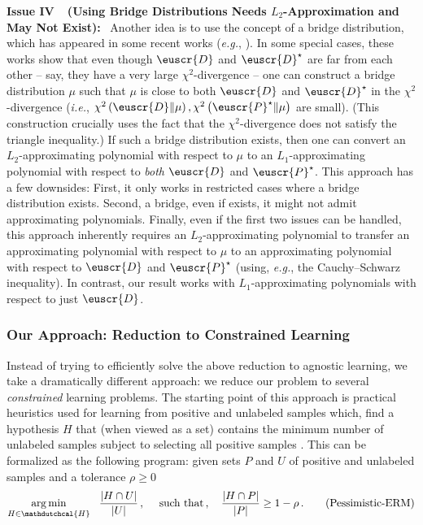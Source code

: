 \documentclass[11pt]{article}
\theoremstyle{plain}
\theoremstyle{definition}
\theoremstyle{remark}
\def\abs#1{\left| #1 \right|}
\newcommand{\inparen}[1]{\left(#1\right)}
\newcommand{\argmin}{\operatornamewithlimits{arg\,min}}
\newcommand{\chidiv}[2]{\chi^2\inparen{#1\|#2}}
\newcommand{\customcal}[1]{\euscr{#1}}
\newcommand{\cD}{\customcal{D}}
\newcommand{\cP}{\customcal{P}}
\renewcommand{\paragraph}[1]{\medskip \noindent\textbf{#1}~}
\newcommand{\ie}{\textit{i.e.}}
\newcommand{\eg}{\textit{e.g.}}
\newcommand{\hypo}[1]{\mathdutchcal{#1}}
\newcommand{\hyH}{\hypo{H}}
\newcommand{\pERM}{Pessimistic-ERM}
\newcommand{\cDtrue}{\cD^\star}
\newcommand{\cPtrue}{\cP^\star}
\newcommand{\nL}{L}
\begin{document}
            \paragraph{Issue IV~~(Using Bridge Distributions Needs $\nL_2$-Approximation and May Not Exist):} 
                Another idea is to use the concept of a bridge distribution, which has appeared in some recent works (\eg{}, \cite{Kontonis2019EfficientTS,kalavasis2024transfer,lee2024unknown}).
                In some special cases, these works show that even though $\cD$ and $\cDtrue$ are far from each other -- say, they have a very large $\chi^2$-divergence -- one can construct a bridge distribution $\mu$ such that $\mu$ is close to both $\cD$ and $\cDtrue$ in the $\chi^2$-divergence (\ie{}, $\chidiv{\cD}{\mu},\chidiv{\cPtrue}{\mu}$ are small).
                (This construction crucially uses the fact that the $\chi^2$-divergence does not satisfy the triangle inequality.)
                If such a bridge distribution exists, then one can convert an $\nL_2$-approximating polynomial with respect to $\mu$  to an $\nL_1$-approximating polynomial with respect to \textit{both} $\cD$ and $\cPtrue$.
                This approach has a few downsides:
                First, it only works in restricted cases where a bridge distribution exists.
                Second, a bridge, even if exists, it might not admit approximating polynomials.
                Finally, even if the first two issues can be handled, this approach inherently require{s} an $\nL_2$-approximating polynomial to transfer an approximating polynomial with respect to $\mu$ to an approximating polynomial with respect to $\cD$ and $\cPtrue$ (using, \eg{}, the Cauchy--Schwarz inequality).
            In contrast, our result works with $\nL_1$-approximating polynomials with respect to just $\cD$.
                
            
                
        \subsubsection{Our Approach: Reduction to Constrained Learning} 
            Instead of trying to efficiently solve the above reduction to agnostic learning, we take a dramatically different approach:
            we reduce our problem to several \textit{constrained} learning problems.
            The starting point of this approach is practical heuristics used for learning from positive and unlabeled samples which, find a hypothesis $H$ that (when viewed as a set) contains the minimum number of unlabeled samples subject to selecting all positive samples \cite{bekker2020learning}.
            This can be formalized as the following program: given sets $P$ and $U$ of positive and unlabeled samples and a tolerance $\rho\geq 0$ %
            \[
                \argmin_{H\in \hyH}~~ \frac{\abs{H\cap U}}{\abs{U}}
                \,,\quad\text{ such that}\,,\quad 
                \frac{\abs{H\cap P}}{\abs{P}} \geq 1-\rho
                \,.
                \tag{\pERM{}}
            \]
\end{document}

